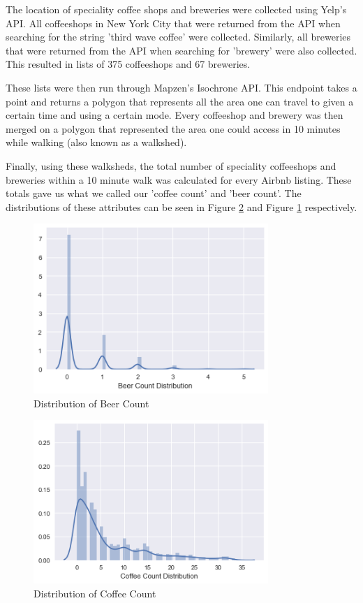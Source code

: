 \documentclass[conference]{IEEEtran}
\begin{document}
The location of speciality coffee shops and breweries were collected using Yelp's API.\cite{yelp_api}
All coffeeshops in New York City that were returned from the API when searching for the
string 'third wave coffee' were collected. Similarly, all breweries that were returned
from the API when searching for 'brewery' were also collected. This resulted in lists of
375 coffeeshops and 67 breweries.

These lists were then run through Mapzen's Isochrone API.\cite{mapzen_isochrone} This endpoint takes a point
and returns a polygon that represents all the area one can travel to given a certain time
and using a certain mode. Every coffeeshop and brewery was then merged on a polygon that
represented the area one could access in 10 minutes while walking (also known as a walkshed).

Finally, using these walksheds, the total number of speciality coffeeshops and breweries within
a 10 minute walk was calculated for every Airbnb listing. These totals gave us what we called
our 'coffee count' and 'beer count'. The distributions of these attributes can be seen in
Figure \ref{fig_coffee_count} and Figure \ref{fig_beer_count} respectively.

\begin{figure}[!t]
\centering
\includegraphics[width=3.5in]{beer_count}
\caption{Distribution of Beer Count}
\label{fig_beer_count}
\end{figure}

\begin{figure}[!t]
\centering
\includegraphics[width=3.5in]{coffee_count}
\caption{Distribution of Coffee Count}
\label{fig_coffee_count}
\end{figure}
\end{document}
